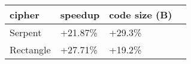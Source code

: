 \begin{tabular}{|l K{3cm}|K{3cm}|K{3cm}|}
  \hline
  \textbf{cipher} & \textbf{speedup} & \textbf{code size (B)}\\
  \hline
  Serpent & +21.87\% & +29.3\% \\
  \hline
  Rectangle & +27.71\% & +19.2\% \\
  \hline
\end{tabular}